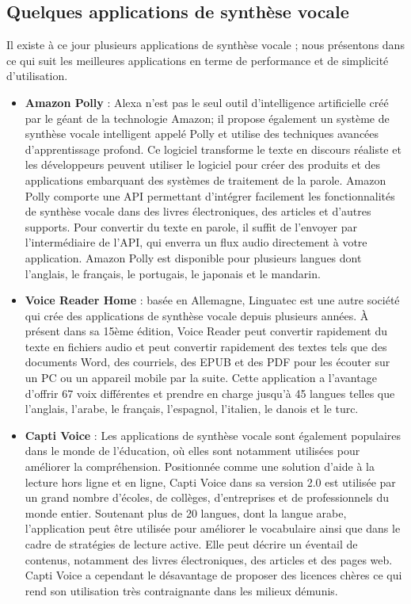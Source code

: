 \subsection{Quelques applications de synthèse vocale}
Il existe à ce jour plusieurs applications de synthèse vocale \cite{ttsapps}; nous présentons dans ce qui suit les meilleures applications en terme de performance et de simplicité d'utilisation.
\begin{itemize}
    \item \textbf{Amazon Polly} : Alexa n'est pas le seul outil d'intelligence artificielle créé par le géant de la technologie Amazon; il propose également un système de synthèse vocale intelligent appelé Polly \cite{polly} et utilise des techniques avancées d'apprentissage profond. Ce logiciel transforme le texte en discours réaliste et les développeurs peuvent utiliser le logiciel pour créer des produits et des applications embarquant des systèmes de traitement de la parole. Amazon Polly comporte une API permettant d'intégrer facilement les fonctionnalités de synthèse vocale dans des livres électroniques, des articles et d'autres supports. Pour convertir du texte en parole, il suffit de l'envoyer par l'intermédiaire de l'API, qui enverra un flux audio directement à votre application. Amazon Polly est disponible pour plusieurs langues dont l'anglais, le français, le portugais, le japonais et le mandarin. \\
    
    \item \textbf{Voice Reader Home} : basée en Allemagne, Linguatec est une autre société qui crée des applications de synthèse vocale depuis plusieurs années. À présent dans sa 15ème édition, Voice Reader \cite{voicereader} peut convertir rapidement du texte en fichiers audio et peut convertir rapidement des textes tels que des documents Word, des courriels, des EPUB et des PDF pour les écouter sur un PC ou un appareil mobile par la suite. Cette application a l'avantage d'offrir 67 voix différentes et prendre en charge jusqu'à 45 langues telles que l'anglais, l'arabe, le français, l'espagnol, l'italien, le danois et le turc. \\ 
    
    \item \textbf{Capti Voice} : Les applications de synthèse vocale sont également populaires dans le monde de l'éducation, où elles sont notamment utilisées pour améliorer la compréhension. Positionnée comme une solution d'aide à la lecture hors ligne et en ligne, Capti Voice dans sa version 2.0 \cite{captivoice} est utilisée par un grand nombre d'écoles, de collèges, d'entreprises et de professionnels du monde entier. Soutenant plus de 20 langues, dont la langue arabe, l'application peut être utilisée pour améliorer le vocabulaire ainsi que dans le cadre de stratégies de lecture active. Elle peut décrire un éventail de contenus, notamment des livres électroniques, des articles et des pages web. Capti Voice a cependant le désavantage de proposer des licences chères ce qui rend son utilisation très contraignante dans les milieux démunis. \\
    

\end{itemize}

